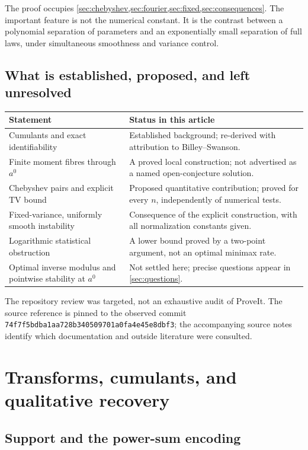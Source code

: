 \documentclass[11pt,a4paper]{article}
\theoremstyle{definition}
\theoremstyle{remark}
\newcommand{\repoSHA}{74f7f5bdba1aa728b340509701a0fa4e45e8dbf3}
\begin{document}
The proof occupies \cref{sec:chebyshev,sec:fourier,sec:fixed,sec:consequences}.
The important feature is not the numerical constant. It is the contrast
between a polynomial separation of parameters and an exponentially small
separation of full laws, under simultaneous smoothness and variance control.

\subsection{What is established, proposed, and left unresolved}

\begin{center}
\small
\begin{tabular}{@{}p{}p{}@{}}
\toprule
Statement & Status in this article\\
\midrule
Cumulants and exact identifiability & Established background; re-derived with
attribution to Billey--Swanson.\\
Finite moment fibres through $a^0$ & A proved local construction; not advertised
as a named open-conjecture solution.\\
Chebyshev pairs and explicit TV bound & Proposed quantitative contribution;
proved for every $n$, independently of numerical tests.\\
Fixed-variance, uniformly smooth instability & Consequence of the explicit
construction, with all normalization constants given.\\
Logarithmic statistical obstruction & A lower bound proved by a two-point
argument, not an optimal minimax rate.\\
Optimal inverse modulus and pointwise stability at $a^0$ & Not settled here;
precise questions appear in \cref{sec:questions}.\\
\bottomrule
\end{tabular}
\end{center}

The repository review was targeted, not an exhaustive audit of ProveIt.
The source reference is pinned to the observed commit
\texttt{\repoSHA}; the accompanying source notes identify which documentation
and outside literature were consulted.

\section{Transforms, cumulants, and qualitative recovery}
\label{sec:background}

\subsection{Support and the power-sum encoding}
\end{document}
